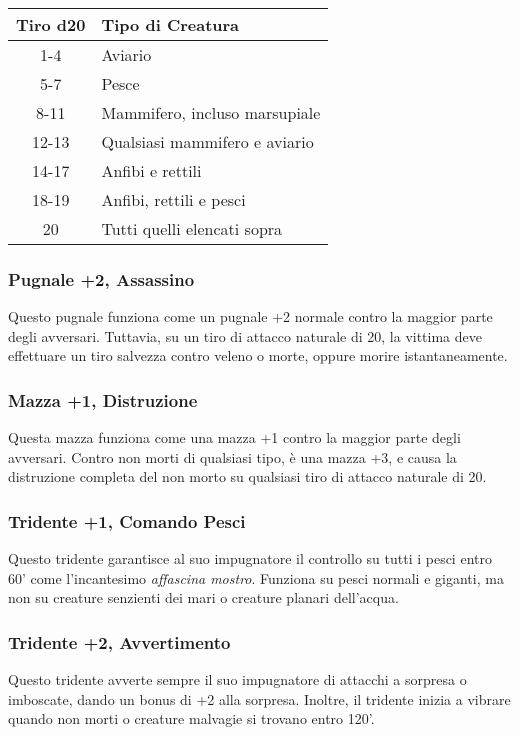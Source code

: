 \documentclass{article}
\begin{document}
\begin{multicols}{2}
\begin{table}[h]
\centering
\begin{tabular}{|c|l|}
\hline
\textbf{Tiro d20} & \textbf{Tipo di Creatura} \\
\hline
1-4 & Aviario \\
5-7 & Pesce \\
8-11 & Mammifero, incluso marsupiale \\
12-13 & Qualsiasi mammifero e aviario \\
14-17 & Anfibi e rettili \\
18-19 & Anfibi, rettili e pesci \\
20 & Tutti quelli elencati sopra \\
\hline
\end{tabular}

\end{table}

\subsubsection{Pugnale +2, Assassino}
Questo pugnale funziona come un pugnale +2 normale contro la maggior parte degli avversari. Tuttavia, su un tiro di attacco naturale di 20, la vittima deve effettuare un tiro salvezza contro veleno o morte, oppure morire istantaneamente.

\subsubsection{Mazza +1, Distruzione}
Questa mazza funziona come una mazza +1 contro la maggior parte degli avversari. Contro non morti di qualsiasi tipo, è una mazza +3, e causa la distruzione completa del non morto su qualsiasi tiro di attacco naturale di 20.

\subsubsection{Tridente +1, Comando Pesci}
Questo tridente garantisce al suo impugnatore il controllo su tutti i pesci entro 60' come l'incantesimo \textit{affascina mostro}. Funziona su pesci normali e giganti, ma non su creature senzienti dei mari o creature planari dell'acqua.

\subsubsection{Tridente +2, Avvertimento}
Questo tridente avverte sempre il suo impugnatore di attacchi a sorpresa o imboscate, dando un bonus di +2 alla sorpresa. Inoltre, il tridente inizia a vibrare quando non morti o creature malvagie si trovano entro 120'.


\end{multicols}
\end{document}
